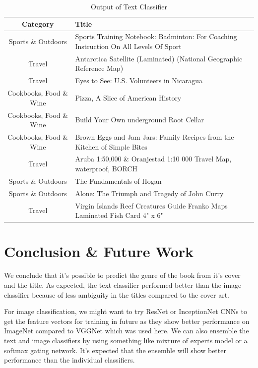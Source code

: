 \documentclass[conference]{IEEEtran}
\begin{document}
\begin{table}[hbtp]
\centering
\caption{Output of Text Classifier}
\begin{center}
\begin{tabular}{c|p{5cm}}
\textbf{Category} & \textbf{Title} \\
\hline
Sports \& Outdoors	&	Sports Training Notebook: Badminton: For Coaching Instruction On All Levels Of Sport \\
\hline
Travel			&	Antarctica Satellite (Laminated) (National Geographic Reference Map) \\
\hline
Travel			&	Eyes to See: U.S. Volunteers in Nicaragua \\
\hline
Cookbooks, Food \& Wine	&	Pizza, A Slice of American History \\
\hline
Cookbooks, Food \& Wine	&	Build Your Own underground Root Cellar \\
\hline
Cookbooks, Food \& Wine	&	Brown Eggs and Jam Jars: Family Recipes from the Kitchen of Simple Bites \\
\hline
Travel			&	Aruba 1:50,000 \& Oranjestad 1:10 000 Travel Map, waterproof, BORCH \\
\hline
Sports \& Outdoors	&	The Fundamentals of Hogan \\
\hline
Sports \& Outdoors	&	Alone: The Triumph and Tragedy of John Curry \\
\hline
Travel       		&	Virgin Islands Reef Creatures Guide Franko Maps Laminated Fish Card 4" x 6" \\
\end{tabular}
\label{tab5}
\end{center}
\end{table}

\section{Conclusion \& Future Work}
We conclude that it’s possible to predict the genre of the book from it’s cover and the title. As expected, the text classifier performed better than the image classifier because of less ambiguity in the titles compared to the cover art. 

For image classification, we might want to try ResNet or InceptionNet CNNs to get the feature vectors for training in future as they show better performance on ImageNet compared to VGGNet which was used here. We can also ensemble the text and image classifiers by using something like mixture of experts model or a softmax gating network. It’s expected that the ensemble will show better performance than the individual classifiers. 
\end{document}

